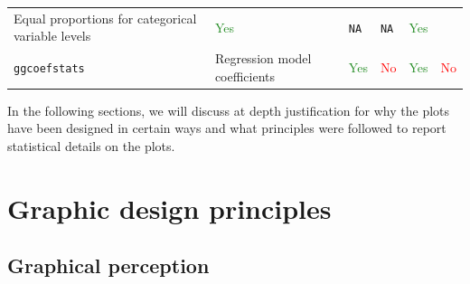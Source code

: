 \documentclass[
]{article}
\begin{document}
\begin{longtable}[]{@{}llllll@{}}
\begin{minipage}[t]{0.35\columnwidth}
Equal proportions for categorical variable levels\strut
\end{minipage} & \begin{minipage}[t]{0.08\columnwidth}\raggedright
\textcolor{ForestGreen}{Yes}\strut
\end{minipage} & \begin{minipage}[t]{0.10\columnwidth}\raggedright
\texttt{NA}\strut
\end{minipage} & \begin{minipage}[t]{0.08\columnwidth}\raggedright
\texttt{NA}\strut
\end{minipage} & \begin{minipage}[t]{0.10\columnwidth}\raggedright
\textcolor{ForestGreen}{Yes}\strut
\end{minipage}\tabularnewline
\begin{minipage}[t]{0.14\columnwidth}\raggedright
\texttt{ggcoefstats}\strut
\end{minipage} & \begin{minipage}[t]{0.35\columnwidth}\raggedright
Regression model coefficients\strut
\end{minipage} & \begin{minipage}[t]{0.08\columnwidth}\raggedright
\textcolor{ForestGreen}{Yes}\strut
\end{minipage} & \begin{minipage}[t]{0.10\columnwidth}\raggedright
\textcolor{red}{No}\strut
\end{minipage} & \begin{minipage}[t]{0.08\columnwidth}\raggedright
\textcolor{ForestGreen}{Yes}\strut
\end{minipage} & \begin{minipage}[t]{0.10\columnwidth}\raggedright
\textcolor{red}{No}\strut
\end{minipage}\tabularnewline
\bottomrule
\end{longtable}

In the following sections, we will discuss at depth justification for why the
plots have been designed in certain ways and what principles were followed to
report statistical details on the plots.

\hypertarget{graphic-design-principles}{%
\section{Graphic design principles}\label{graphic-design-principles}}

\hypertarget{graphical-perception}{%
\subsection{Graphical perception}\label{graphical-perception}}
\end{document}
